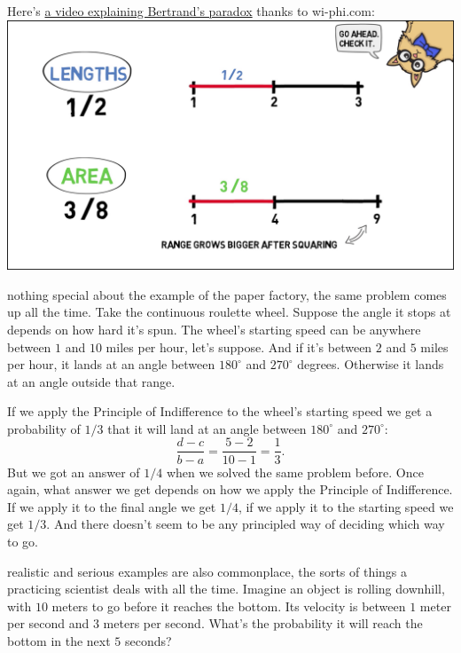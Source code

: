 \documentclass[justified]{tufte-book}
\newcommand{\degr}{^{\circ}}
\theoremstyle{definition}
\theoremstyle{definition}
\theoremstyle{definition}
\theoremstyle{definition}
\theoremstyle{remark}
\begin{document}
\begin{marginfigure}
Here's \href{http://www.wi-phi.com/video/bertrands-paradox}{a video
explaining Bertrand's paradox} thanks to wi-phi.com:
\href{http://www.wi-phi.com/video/bertrands-paradox}{\includegraphics{img/bertrand_screengrab.png}}
\end{marginfigure}

 nothing special about the example of the paper factory, the same problem comes up all the time. Take the continuous roulette wheel. Suppose the angle it stops at depends on how hard it's spun. The wheel's starting speed can be anywhere between \(1\) and \(10\) miles per hour, let's suppose. And if it's between \(2\) and \(5\) miles per hour, it lands at an angle between \(180\degr\) and \(270\degr\) degrees. Otherwise it lands at an angle outside that range.

If we apply the Principle of Indifference to the wheel's starting speed we get a probability of \(1/3\) that it will land at an angle between \(180\degr\) and \(270\degr\):
\[ \frac{d-c}{b-a} = \frac{5-2}{10-1} = \frac{1}{3}. \]
But we got an answer of \(1/4\) when we solved the same problem before. Once again, what answer we get depends on how we apply the Principle of Indifference. If we apply it to the final angle we get \(1/4\), if we apply it to the starting speed we get \(1/3\). And there doesn't seem to be any principled way of deciding which way to go.

 realistic and serious examples are also commonplace, the sorts of things a practicing scientist deals with all the time. Imagine an object is rolling downhill, with \(10\) meters to go before it reaches the bottom. Its velocity is between \(1\) meter per second and \(3\) meters per second. What's the probability it will reach the bottom in the next \(5\) seconds?
\end{document}
